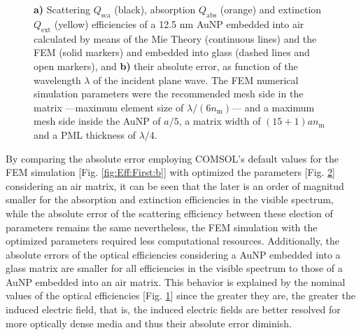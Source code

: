 \begin{figure}[h!]
 \def\svgwidth{.9\textwidth}
 \small
 \centering
    \hspace*{-.95\textwidth}
     \begin{subfigure}{\textwidth}\caption{}\label{fig:Eff:Conv:a}\end{subfigure}\\[11.5em]
    \hspace*{-.95\textwidth}
     \begin{subfigure}{\textwidth}\caption{}\label{fig:Eff:Conv:b}\end{subfigure}\\[-15em]
\caption[Scattering, Absorption and Extinction Efficiencies of a 12.5 nm AuNP$@$Air: Analytical and FEM solutions with optimized parameters for a FEM simulation]{\textbf{a)} Scattering $Q_\text{sca}$ (black), absorption $Q_\text{abs}$ (orange) and extinction $Q_\text{ext}$ (yellow) efficiencies of a 12.5 nm AuNP embedded into air calculated by means of the Mie Theory (continuous lines) and the FEM (solid markers) and embedded into glass (dashed lines and open markers), and \textbf{b)} their absolute error, as function of the wavelength $\lambda$ of the incident plane wave. The FEM numerical simulation parameters were the recommended mesh side in the matrix ---maximum element size of $\lambda/(6n_\text{m})$--- and a maximum mesh side inside the AuNP of $a/5$, a matrix width of $(15+1) a n_\text{m}$ and a PML thickness of $\lambda/4$.}
\label{fig:Eff:Conv}
\end{figure}

By comparing the absolute error employing COMSOL's default values for the FEM simulation [Fig. \ref{fig:Eff:First:b}] with optimized the parameters [Fig. \ref{fig:Eff:Conv:b}] considering an air matrix, it can be seen that the later is an order of magnitud smaller for the absorption and extinction efficiencies in the visible spectrum, while the absolute error of the scattering efficiency between these election of parameters remains the same nevertheless, the FEM simulation with the optimized parameters required less computational resources. Additionally, the absolute errors of the optical efficiencies considering a AuNP embedded into a glass matrix are smaller for all efficiencies in the visible spectrum to those of a AuNP embedded into an air matrix. This behavior is explained by the nominal values of the optical efficiencies [Fig. \ref{fig:Eff:Conv:a}] since the greater they are, the greater the induced electric field, that is, the induced electric fields are better resolved for more optically dense media and thus their absolute error diminish.
